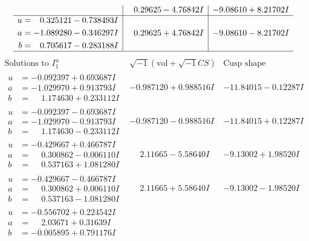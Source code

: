\documentclass[1p]{elsarticle_modified}
\theoremstyle{definition}
\newcommand{\I}{\sqrt{-1}}
\begin{document}
$$\begin{array}{c|c|c}
 & \phantom{-}0.29625 - 4.76842 I & -9.08610 + 8.21702 I \\ \hline\begin{aligned}
u &= \phantom{-}0.325121 - 0.738493 I \\
a &= -1.089280 - 0.346297 I \\
b &= \phantom{-}0.705617 - 0.283188 I\end{aligned}
 & \phantom{-}0.29625 + 4.76842 I & -9.08610 - 8.21702 I\\
 \hline 
 \end{array}$$\newpage$$\begin{array}{c|c|c}  
\text{Solutions to }I^u_{1}& \I (\text{vol} + \sqrt{-1}CS) & \text{Cusp shape}\\
 \hline 
\begin{aligned}
u &= -0.092397 + 0.693687 I \\
a &= -1.029970 + 0.913793 I \\
b &= \phantom{-}1.174630 + 0.233112 I\end{aligned}
 & -0.987120 + 0.988516 I & -11.84015 - 0.12287 I \\ \hline\begin{aligned}
u &= -0.092397 - 0.693687 I \\
a &= -1.029970 - 0.913793 I \\
b &= \phantom{-}1.174630 - 0.233112 I\end{aligned}
 & -0.987120 - 0.988516 I & -11.84015 + 0.12287 I \\ \hline\begin{aligned}
u &= -0.429667 + 0.466787 I \\
a &= \phantom{-}0.300862 - 0.006110 I \\
b &= \phantom{-}0.537163 + 1.081280 I\end{aligned}
 & \phantom{-}2.11665 - 5.58640 I & -9.13002 + 1.98520 I \\ \hline\begin{aligned}
u &= -0.429667 - 0.466787 I \\
a &= \phantom{-}0.300862 + 0.006110 I \\
b &= \phantom{-}0.537163 - 1.081280 I\end{aligned}
 & \phantom{-}2.11665 + 5.58640 I & -9.13002 - 1.98520 I \\ \hline\begin{aligned}
u &= -0.556702 + 0.224542 I \\
a &= \phantom{-}2.03671 + 0.31639 I \\
b &= -0.005895 + 0.791176 I\end{aligned}

\end{array}$$
\end{document}
